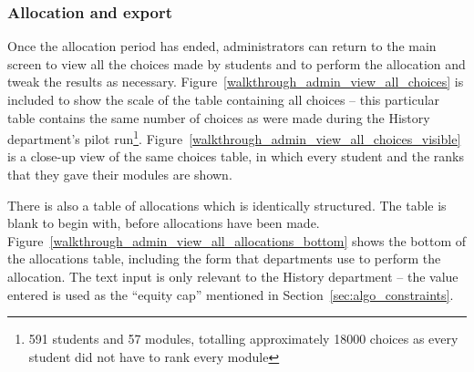 
\subsubsection{Allocation and export}

Once the allocation period has ended, administrators can return to the main
screen to view all the choices made by students and to perform the allocation
and tweak the results as necessary.
Figure~\ref{walkthrough_admin_view_all_choices} is included to show the scale
of the table containing all choices -- this particular table contains the same
number of choices as were made during the History department's pilot
run\footnote{591 students and 57 modules, totalling approximately 18000
choices as every student did not have to rank every module}.
Figure~\ref{walkthrough_admin_view_all_choices_visible} is a close-up view of
the same choices table, in which every student and the ranks that they gave
their modules are shown.

There is also a table of allocations which is identically structured. The
table is blank to begin with, before allocations have been made.
Figure~\ref{walkthrough_admin_view_all_allocations_bottom} shows the bottom of
the allocations table, including the form that departments use to perform the
allocation. The text input is only relevant to the History department -- the
value entered is used as the ``equity cap'' mentioned in
Section~\ref{sec:algo_constraints}.


